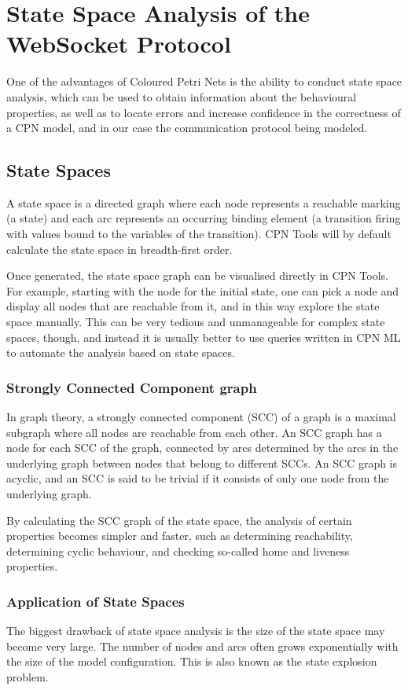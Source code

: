 \chapter{State Space Analysis of the WebSocket Protocol}
\label{chap:statespace}

One of the advantages of Coloured Petri Nets is the ability to conduct state
space analysis, which can be used to obtain information about the
behavioural properties, as well as to locate errors
and increase confidence in the correctness of a CPN model, and in our case the
communication protocol being modeled.

\section{State Spaces}
A state space is a directed graph where each node represents a reachable marking
(a state) and each arc represents an occurring binding element (a transition
firing with values bound to the variables of the transition). CPN Tools will
by default calculate the state space in breadth-first order. 

Once generated, the state space graph can be visualised directly in CPN Tools.
For example, starting with the node for the initial state, one can pick a node
and display all nodes that are reachable from it, and in this way explore the state space
manually. This can be very tedious and unmanageable for complex state spaces,
though, and instead it is usually better to use queries written in CPN ML to
automate the analysis based on state spaces.

	\subsection{Strongly Connected Component graph}
	In graph theory, a strongly connected component (SCC) of a graph is a maximal
	subgraph where all nodes are reachable from each other. An SCC graph has a node
	for each SCC of the graph, connected by arcs determined by the arcs in the
	underlying graph between nodes that belong to different SCCs. An
	SCC graph is acyclic, and an SCC is said to be trivial if it consists of only
	one node from the underlying graph.
	
	By calculating the SCC graph of the state space, the analysis of certain
	properties becomes simpler and faster, such as determining reachability,
	determining cyclic behaviour, and checking so-called home and liveness
	properties.

	\subsection{Application of State Spaces}
		The biggest drawback of state space analysis is the size of the state space
		may become very large. The number of nodes and arcs often grows exponentially
		with the size of the model configuration.
		This is also known as the state explosion problem.
		
